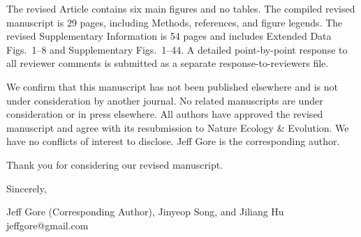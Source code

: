 \documentclass[11pt]{article}
\begin{document}
The revised Article contains six main figures and no tables. The compiled revised manuscript is 29 pages, including Methods, references, and figure legends. The revised Supplementary Information is 54 pages and includes Extended Data Figs.~1--8 and Supplementary Figs.~1--44. A detailed point-by-point response to all reviewer comments is submitted as a separate response-to-reviewers file.

We confirm that this manuscript has not been published elsewhere and is not under consideration by another journal. No related manuscripts are under consideration or in press elsewhere. All authors have approved the revised manuscript and agree with its resubmission to Nature Ecology \& Evolution. We have no conflicts of interest to disclose. Jeff Gore is the corresponding author.

Thank you for considering our revised manuscript.

Sincerely,

Jeff Gore (Corresponding Author), Jinyeop Song, and Jiliang Hu\\
jeffgore@gmail.com
\end{document}
